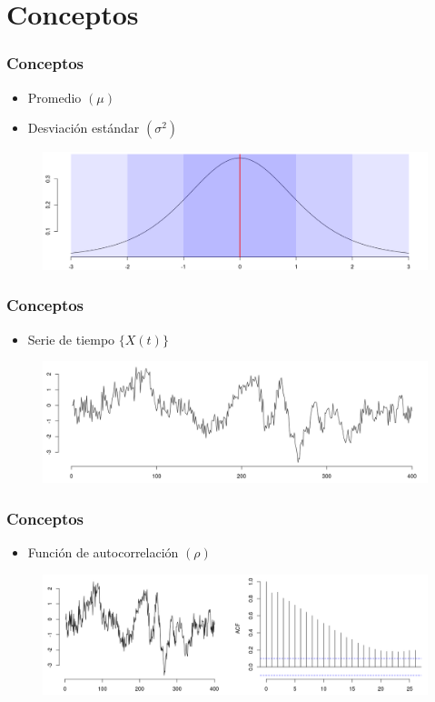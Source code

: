 \documentclass[11pt]{beamer}
\begin{document}
\section{Conceptos}

\begin{frame}\frametitle{Conceptos}
\begin{itemize}
\item Promedio $( \mu )$
\item Desviaci\'on est\'andar $( \sigma^{2} )$
\end{itemize}
\begin{figure}
\centering
\includegraphics[width=\linewidth]{./curso_scripts/prob.png}
\end{figure}
\end{frame}


\begin{frame}\frametitle{Conceptos}
\begin{itemize}
\item Serie de tiempo $\{ X(t) \}$
\end{itemize}
\begin{figure}
\centering
\includegraphics[width=\linewidth]{./curso_scripts/tseries.png}
\end{figure}
\end{frame}


\begin{frame}\frametitle{Conceptos}
\begin{itemize}
\item Funci\'on de autocorrelaci\'on $(\rho)$
\end{itemize}
\begin{figure}
\centering
\includegraphics[width=\linewidth]{./curso_scripts/acf.png}
\end{figure}
\end{frame}
\end{document}
